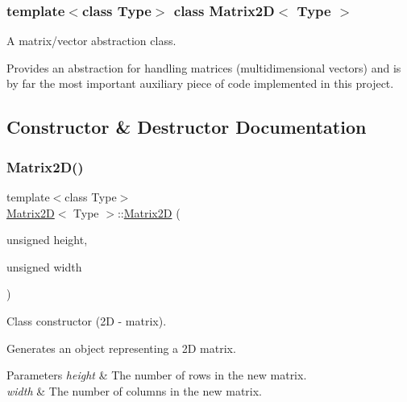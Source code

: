 \subsubsection*{template$<$class Type$>$\newline
class Matrix2\+D$<$ Type $>$}

A matrix/vector abstraction class. 

Provides an abstraction for handling matrices (multidimensional vectors) and is by far the most important auxiliary piece of code implemented in this project. 

\subsection{Constructor \& Destructor Documentation}
\mbox{\label{classMatrix2D_a6166db3bae116e2f009721534abdb2de}} 
\subsubsection{\texorpdfstring{Matrix2\+D()}{Matrix2D()}\hspace{0.1cm}{\footnotesize\ttfamily [1/3]}}
{\footnotesize\ttfamily template$<$class Type$>$ \\
\hyperlink{classMatrix2D}{Matrix2D}$<$ Type $>$\+::\hyperlink{classMatrix2D}{Matrix2D} (\begin{DoxyParamCaption}\item[{unsigned}]{height,  }\item[{unsigned}]{width }\end{DoxyParamCaption})\hspace{0.3cm}{\ttfamily [inline]}}



Class constructor (2D -\/ matrix). 

Generates an object representing a 2D matrix. 
\begin{DoxyParams}{Parameters}
{\em height} & The number of rows in the new matrix. \\
\hline
{\em width} & The number of columns in the new matrix. \\
\hline
\end{DoxyParams}
\mbox{\label{classMatrix2D_aab23e73fe109ec1eb39dc442bcb67cbe}} 
